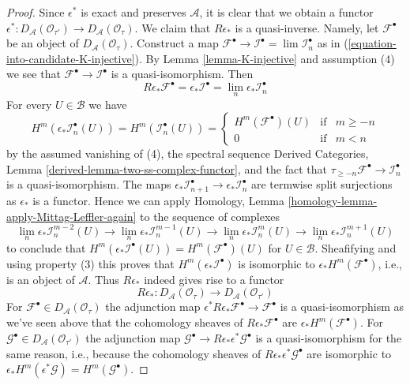 \begin{proof}
\medskip\noindent
Since $\epsilon^*$ is exact and preserves $\mathcal{A}$, it is clear that
we obtain a functor $\epsilon^* : D_\mathcal{A}(\mathcal{O}_{\tau'}) \to
D_\mathcal{A}(\mathcal{O}_\tau)$. We claim that $R\epsilon_*$ is a
quasi-inverse. Namely, let $\mathcal{F}^\bullet$ be an
object of $D_\mathcal{A}(\mathcal{O}_\tau)$. Construct a map
$\mathcal{F}^\bullet \to \mathcal{I}^\bullet = \lim \mathcal{I}_n^\bullet$
as in (\ref{equation-into-candidate-K-injective}). By
Lemma \ref{lemma-K-injective} and assumption (4) we see that
$\mathcal{F}^\bullet \to \mathcal{I}^\bullet$ is a quasi-isomorphism.
Then
$$
R\epsilon_*\mathcal{F}^\bullet = \epsilon_*\mathcal{I}^\bullet =
\lim_n \epsilon_*\mathcal{I}_n^\bullet
$$
For every $U \in \mathcal{B}$ we have
$$
H^m(\epsilon_*\mathcal{I}_n^\bullet(U)) =
H^m(\mathcal{I}_n^\bullet(U)) =
\left\{
\begin{matrix}
H^m(\mathcal{F}^\bullet)(U) & \text{if} & m \geq -n \\
0 & \text{if} & m < n
\end{matrix}
\right.
$$
by the assumed vanishing of (4), the spectral sequence
Derived Categories, Lemma \ref{derived-lemma-two-ss-complex-functor},
and the fact that
$\tau_{\geq -n}\mathcal{F}^\bullet \to \mathcal{I}_n^\bullet$
is a quasi-isomorphism. The maps
$\epsilon_*\mathcal{I}_{n + 1}^\bullet \to \epsilon_*\mathcal{I}_n^\bullet$
are termwise split surjections as $\epsilon_*$ is a functor.
Hence we can apply
Homology, Lemma \ref{homology-lemma-apply-Mittag-Leffler-again}
to the sequence of complexes
$$
\lim_n \epsilon_*\mathcal{I}_n^{m - 2}(U) \to
\lim_n \epsilon_*\mathcal{I}_n^{m - 1}(U) \to
\lim_n \epsilon_*\mathcal{I}_n^m(U) \to
\lim_n \epsilon_*\mathcal{I}_n^{m + 1}(U)
$$
to conclude that
$H^m(\epsilon_*\mathcal{I}^\bullet(U)) = H^m(\mathcal{F}^\bullet)(U)$
for $U \in \mathcal{B}$.
Sheafifying and using property (3) this proves that
$H^m(\epsilon_*\mathcal{I}^\bullet)$ is isomorphic
to $\epsilon_*H^m(\mathcal{F}^\bullet)$, i.e., is an object of
$\mathcal{A}$. Thus $R\epsilon_*$ indeed gives rise to a functor
$$
R\epsilon_* : 
D_\mathcal{A}(\mathcal{O}_\tau)
\longrightarrow
D_\mathcal{A}(\mathcal{O}_{\tau'})
$$
For $\mathcal{F}^\bullet \in D_\mathcal{A}(\mathcal{O}_\tau)$
the adjunction map
$\epsilon^*R\epsilon_*\mathcal{F}^\bullet \to \mathcal{F}^\bullet$
is a quasi-isomorphism as we've seen above that the cohomology sheaves
of $R\epsilon_*\mathcal{F}^\bullet$ are
$\epsilon_*H^m(\mathcal{F}^\bullet)$. For
$\mathcal{G}^\bullet \in D_\mathcal{A}(\mathcal{O}_{\tau'})$ the
adjunction map
$\mathcal{G}^\bullet \to R\epsilon_*\epsilon^*\mathcal{G}^\bullet$
is a quasi-isomorphism for the same reason, i.e., because
the cohomology sheaves of $R\epsilon_*\epsilon^*\mathcal{G}^\bullet$
are isomorphic to
$\epsilon_*H^m(\epsilon^*\mathcal{G}) = H^m(\mathcal{G}^\bullet)$.
\end{proof}










